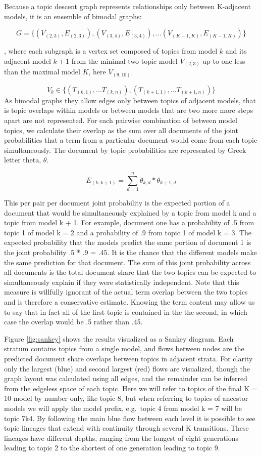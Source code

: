 \documentclass[]{book}
\theoremstyle{definition}
\theoremstyle{definition}
\theoremstyle{definition}
\theoremstyle{remark}
\begin{document}
Because a topic descent graph represents relationships only between
K-adjacent models, it is an ensemble of bimodal graphs:

\[G=\{(V_{(2,3)},E_{(2,3)}),(V_{(3,4)},E_{(3,4)}),...(V_{(K-1,K)},E_{(K-1,K)})\}\]

, where each subgraph is a vertex set composed of topics from model
\(k\) and its adjacent model \(k + 1\) from the minimal two topic model
\(V_{(2,3)}\) up to one less than the maximal model \(K\), here
\(V_{(9,10)}\).

\[V_k\in\{(T_{(k,1)},...T_{(k,n)}),(T_{(k+1,1)},...T_{(k+1,n)})\}\] As
bimodal graphs they allow edges only between topics of adjacent models,
that is topic overlaps within models or between models that are two more
more steps apart are not represented. For each pairwise combination of
between model topics, we calculate their overlap as the sum over all
documents of the joint probabilities that a term from a particular
document would come from each topic simultaneously. The document by
topic probabilities are represented by Greek letter theta, \(\theta\).

\[E_{(k,k+1)}={\sum^n_{d=1}\theta_{k,d}*\theta_{k+1,d}}\]

This per pair per document joint probability is the expected portion of
a document that would be simultaneously explained by a topic from model
k and a topic from model k + 1. For example, document one has a
probability of .5 from topic 1 of model k = 2 and a probability of .9
from topic 1 of model k = 3. The expected probability that the models
predict the same portion of document 1 is the joint probability .5 * .9
= .45. It is the chance that the different models make the same
prediction for that document. The sum of this joint probability across
all documents is the total document share that the two topics can be
expected to simultaneously explain if they were statistically
independent. Note that this measure is willfully ignorant of the actual
term overlap between the two topics and is therefore a conservative
estimate. Knowing the term content may allow us to say that in fact all
of the first topic is contained in the the second, in which case the
overlap would be .5 rather than .45.

Figure \ref{fig:sankey} shows the results visualized as a Sankey
diagram. Each stratum contains topics from a single model, and flows
between nodes are the predicted document share overlaps between topics
in adjacent strata. For clarity only the largest (blue) and second
largest (red) flows are visualized, though the graph layout was
calculated using all edges, and the remainder can be inferred from the
edgeless space of each topic. Here we will refer to topics of the final
K = 10 model by number only, like topic 8, but when referring to topics
of ancestor models we will apply the model prefix, e.g.~topic 4 from
model k = 7 will be topic 7k4. By following the main blue flow between
each level it is possible to see topic lineages that extend with
continuity through several K transitions. These lineages have different
depths, ranging from the longest of eight generations leading to topic 2
to the shortest of one generation leading to topic 9.
\end{document}
